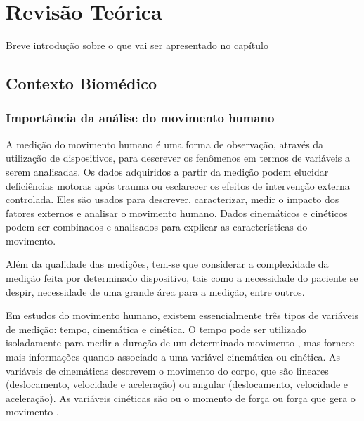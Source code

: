 
\chapter[Revisão Teórica]{Revisão Teórica}
Breve introdução sobre o que vai ser apresentado no capítulo

\section{Contexto Biomédico}
\subsection{Importância da análise do movimento humano}

A medição do movimento humano é uma forma de observação, através da utilização 
de dispositivos, para descrever os fenômenos em termos de variáveis a serem analisadas. 
Os dados adquiridos a partir da medição podem elucidar deficiências 
motoras após trauma ou esclarecer os efeitos de intervenção externa controlada.
Eles são usados para descrever, caracterizar, medir o impacto dos
fatores externos e analisar o movimento humano. Dados cinemáticos e cinéticos podem ser combinados
e analisados para explicar as características do movimento. 

Além da qualidade das medições, tem-se que considerar a complexidade da medição
feita por determinado dispositivo, tais como a necessidade do paciente se despir,
necessidade de uma grande área para a medição, entre outros.

Em estudos do movimento humano, existem essencialmente três tipos de variáveis de medição: tempo,
cinemática e cinética. O tempo pode ser utilizado isoladamente para medir a duração de um determinado movimento
, mas fornece mais informações quando associado a uma variável cinemática ou cinética.
As variáveis de cinemáticas descrevem o movimento do corpo, que são lineares (deslocamento,
velocidade e aceleração) ou angular (deslocamento, velocidade e aceleração).
 As variáveis cinéticas são ou o momento de força ou força que gera o movimento \cite{roberto}.

